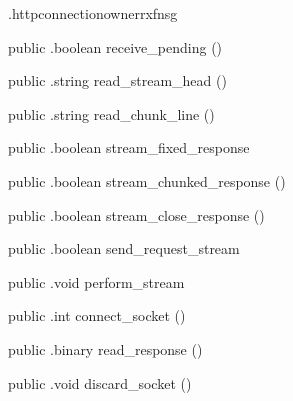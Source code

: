 \begin{CrexxClass}{.httpconnectionowner}{rxfnsg}
\begin{Members}
    \Method
      {public}
      {.boolean}
      {receive\_pending}
      {()}

    \Method
      {public}
      {.string}
      {read\_stream\_head}
      {()}

    \Method
      {public}
      {.string}
      {read\_chunk\_line}
      {()}

    \Method
      {public}
      {.boolean}
      {stream\_fixed\_response}
      {}

    \Method
      {public}
      {.boolean}
      {stream\_chunked\_response}
      {()}

    \Method
      {public}
      {.boolean}
      {stream\_close\_response}
      {()}

    \Method
      {public}
      {.boolean}
      {send\_request\_stream}
      {}

    \Method
      {public}
      {.void}
      {perform\_stream}
      {}

    \Method
      {public}
      {.int}
      {connect\_socket}
      {()}

    \Method
      {public}
      {.binary}
      {read\_response}
      {()}

    \Method
      {public}
      {.void}
      {discard\_socket}
      {()}

  \end{Members}
\end{CrexxClass}

